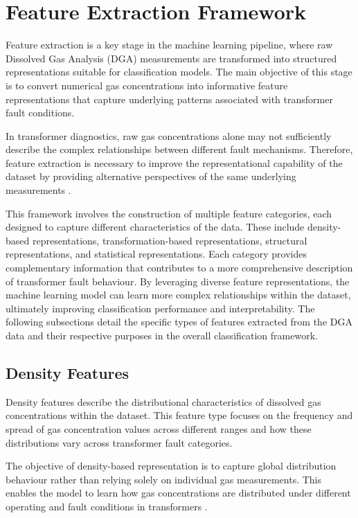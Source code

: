 \section{Feature Extraction Framework}

Feature extraction is a key stage in the machine learning pipeline, where raw Dissolved Gas Analysis (DGA) measurements are transformed into structured representations suitable for classification models. The main objective of this stage is to convert numerical gas concentrations into informative feature representations that capture underlying patterns associated with transformer fault conditions.

In transformer diagnostics, raw gas concentrations alone may not sufficiently describe the complex relationships between different fault mechanisms. Therefore, feature extraction is necessary to improve the representational capability of the dataset by providing alternative perspectives of the same underlying measurements \parencite{Hu2025InterpretableEdge}.

This framework involves the construction of multiple feature categories, each designed to capture different characteristics of the data. These include density-based representations, transformation-based representations, structural representations, and statistical representations. Each category provides complementary information that contributes to a more comprehensive description of transformer fault behaviour. By leveraging diverse feature representations, the machine learning model can learn more complex relationships within the dataset, ultimately improving classification performance and interpretability. The following subsections detail the specific types of features extracted from the DGA data and their respective purposes in the overall classification framework.

\subsection{Density Features}

Density features describe the distributional characteristics of dissolved gas concentrations within the dataset. This feature type focuses on the frequency and spread of gas concentration values across different ranges and how these distributions vary across transformer fault categories.

The objective of density-based representation is to capture global distribution behaviour rather than relying solely on individual gas measurements. This enables the model to learn how gas concentrations are distributed under different operating and fault conditions in transformers \parencite{Hu2025InterpretableEdge}.

